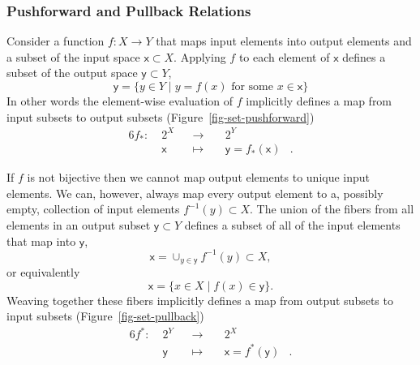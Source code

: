 \documentclass[
  letterpaper,
  DIV=11,
  numbers=noendperiod]{scrartcl}
\begin{document}
\hypertarget{pushforward-and-pullback-relations}{%
\subsubsection{Pushforward and Pullback
Relations}\label{pushforward-and-pullback-relations}}

Consider a function \(f : X \rightarrow Y\) that maps input elements
into output elements and a subset of the input space
\(\mathsf{x} \subset X\). Applying \(f\) to each element of
\(\mathsf{x}\) defines a subset of the output space
\(\mathsf{y} \subset Y\), \[
\mathsf{y} = \{ y \in Y \mid y = f(x) \text{ for some } x \in \mathsf{x} \}
\] In other words the element-wise evaluation of \(f\) implicitly
defines a map from input subsets to output subsets
(Figure~\ref{fig-set-pushforward}) \begin{alignat*}{6}
f_{*} :\; & 2^X & &\rightarrow& \; & 2^Y &
\\
& \mathsf{x} & &\mapsto& & \mathsf{y} = f_{*}(\mathsf{x}) &.
\end{alignat*}

If \(f\) is not bijective then we cannot map output elements to unique
input elements. We can, however, always map every output element to a,
possibly empty, collection of input elements \(f^{-1}(y) \subset X\).
The union of the fibers from all elements in an output subset
\(\mathsf{y} \subset Y\) defines a subset of all of the input elements
that map into \(\mathsf{y}\), \[
\mathsf{x} = \cup_{y \in \mathsf{y}} f^{-1}(y) \subset X,
\] or equivalently \[
\mathsf{x} = \{ x \in X \mid f(x) \in \mathsf{y} \}.
\] Weaving together these fibers implicitly defines a map from output
subsets to input subsets (Figure~\ref{fig-set-pullback})
\begin{alignat*}{6}
f^{*} :\; & 2^Y & &\rightarrow& \; & 2^X &
\\
& \mathsf{y} & &\mapsto& & \mathsf{x} = f^{*}(\mathsf{y}) &.
\end{alignat*}
\end{document}
